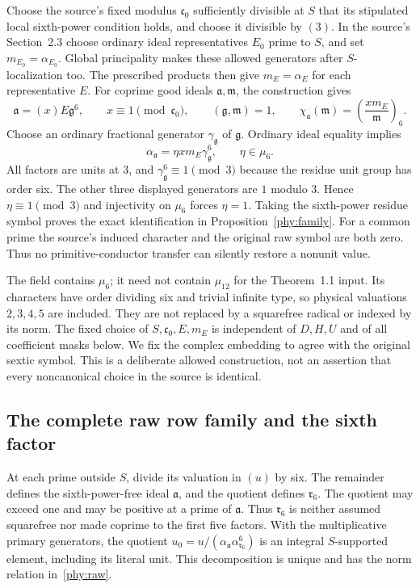Choose the source's fixed modulus $\mathfrak c_0$ sufficiently divisible
at $S$ that its stipulated local sixth-power condition holds, and choose
it divisible by $(3)$. In the source's Section~2.3 choose ordinary ideal
representatives $E_0$ prime to $S$, and set
$m_{E_0}=\alpha_{E_0}$. Global principality makes these allowed
generators after $S$-localization too. The prescribed products then give
$m_E=\alpha_E$ for each representative $E$.
For coprime good ideals $\mathfrak a,\mathfrak m$, the construction gives
\[
 \mathfrak a=(x)E\mathfrak g^6,\qquad
 x\equiv1\pmod{\mathfrak c_0},\qquad
 (\mathfrak g,\mathfrak m)=1,
 \qquad
 \chi_{\mathfrak a}(\mathfrak m)
       =\left(\frac{xm_E}{\mathfrak m}\right)_6.
\]
Choose an ordinary fractional generator $\gamma_{\mathfrak g}$ of
$\mathfrak g$. Ordinary ideal equality implies
\begin{equation}\label{phy:generator-proof}
 \alpha_{\mathfrak a}=\eta x m_E\gamma_{\mathfrak g}^6,
          \qquad\eta\in\mu_6.
\end{equation}
All factors are units at $3$, and
$\gamma_{\mathfrak g}^6\equiv1\pmod3$ because the residue unit
group has order six. The other three displayed generators are $1$
modulo $3$. Hence $\eta\equiv1\pmod3$ and injectivity on $\mu_6$
forces $\eta=1$. Taking the sixth-power residue symbol proves the exact
identification in Proposition~\ref{phy:family}. For a common prime the
source's induced character and the original raw symbol are both zero.
Thus no primitive-conductor transfer can silently restore a nonunit value.

The field contains $\mu_6$; it need not contain $\mu_{12}$ for the
Theorem~1.1 input. Its characters have order dividing six and trivial
infinite type, so physical valuations $2,3,4,5$ are included. They are
not replaced by a squarefree radical or indexed by its norm. The fixed
choice of $S,\mathfrak c_0,E,m_E$ is independent of $D,H,U$ and of all
coefficient masks below. We fix the complex embedding to agree with the
original sextic symbol. This is a deliberate allowed construction, not
an assertion that every noncanonical choice in the source is identical.

\subsection{The complete raw row family and the sixth factor}\label{phy:raw-proof}
At each prime outside $S$, divide its valuation in $(u)$ by six.
The remainder defines the sixth-power-free ideal $\mathfrak a$, and the
quotient defines $\mathfrak r_6$. The quotient may exceed one and may
be positive at a prime of $\mathfrak a$. Thus $\mathfrak r_6$ is neither
assumed squarefree nor made coprime to the first five factors.
With the multiplicative primary generators, the quotient
$u_0=u/(\alpha_{\mathfrak a}\alpha_{\mathfrak r_6}^6)$
is an integral $S$-supported element, including its literal unit.
This decomposition is unique and has the norm relation in~\eqref{phy:raw}.

